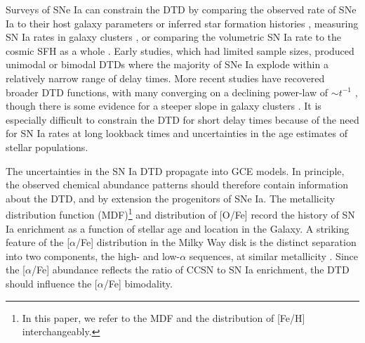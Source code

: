 \documentclass[twocolumn,twocolappendix,linenumbers]{aastex631}
\newcommand{\aFe}{[$\alpha$/Fe]\xspace}
\begin{document}
Surveys of SNe Ia can constrain the DTD by comparing the observed rate of SNe Ia to their host galaxy parameters \citep[e.g.,][]{Mannucci2005-SNRate,Heringer2019-FieldGalaxyDTD} or inferred star formation histories \citep[SFHs; e.g.,][]{Maoz2012-SloanIIDTD}, measuring SN Ia rates in galaxy clusters \citep[e.g.,][]{Maoz2010-ClusterDTD}, or comparing the volumetric SN Ia rate to the cosmic SFH as a whole \citep[e.g.,][]{Graur2014-VolumetricSNIaRates,Strolger2020-ExponentialDTD}. Early studies, which had limited sample sizes, produced unimodal \citep{Strolger2004-SNIaProgenitors} or bimodal \citep{Mannucci2006-TwoPopulations} DTDs where the majority of SNe Ia explode within a relatively narrow range of delay times. More recent studies have recovered broader DTD functions, with many converging on a declining power-law of $\sim t^{-1}$ {\bf \citep[e.g.,][]{Graur2013-IaRateVsMass,Graur2015-UnifiedExplanation,Maoz2017-CosmicDTD,Castrillo2021-DTD,Wiseman2021-DESRates}}, though there is some evidence for a steeper slope in galaxy clusters \citep{Maoz2017-CosmicDTD,FriedmannMaoz2018-ClusterDTD}. It is especially difficult to constrain the DTD for short delay times {\bf \citep{MaozMannucci2012-SNeIaReview,Rodney2014-PromptSNeIa}} because of the need for SN Ia rates at long lookback times and uncertainties in the age estimates of stellar populations.

The uncertainties in the SN Ia DTD propagate into GCE models. In principle, the observed chemical abundance patterns should therefore contain information about the DTD, and by extension the progenitors of SNe Ia. The metallicity distribution function (MDF)\footnote{In this paper, we refer to the MDF and the distribution of [Fe/H] interchangeably.} and distribution of [O/Fe] record the history of SN Ia enrichment as a function of stellar age and location in the Galaxy. A striking feature of the \aFe distribution in the Milky Way disk is the distinct separation into two components, the high- and low-$\alpha$ sequences, at similar metallicity \citep[e.g.,][]{Bensby2014-solarNeighborhoodAbundances}. Since the \aFe abundance reflects the ratio of CCSN to SN Ia enrichment, the DTD should influence the \aFe bimodality.
\end{document}
